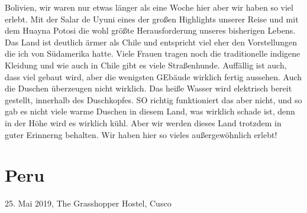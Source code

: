 \documentclass[11pt]{book}
\begin{document}
Bolivien, wir waren nur etwas länger als eine Woche hier aber wir haben so viel erlebt. Mit der Salar de Uyuni eines der großen Highlights unserer Reise 
und mit dem Huayna Potosi die wohl größte Herausforderung unseres bisherigen Lebens. Das Land ist deutlich ärmer als Chile und entspricht viel eher 
den Vorstellungen die ich von Südamerika hatte. Viele Frauen tragen noch die traditionelle indigene Kleidung und wie auch in Chile gibt es viele Straßenhunde. 
Auffällig ist auch, dass viel gebaut wird, aber die wenigsten GEbäude wirklich fertig aussehen. Auch die Duschen überzeugen nicht wirklich. Das heiße 
Wasser wird elektrisch bereit gestellt, innerhalb des Duschkopfes. SO richtig funktioniert das aber nicht, und so gab es nicht viele warme Duschen in diesem 
Land, was wirklich schade ist, denn in der Höhe wird es wirklich kühl. Aber wir werden dieses Land trotzdem in guter Erinnerng behalten. Wir haben 
hier so vieles außergewöhnlich erlebt!


\chapter{Peru}

25. Mai 2019, The Grasshopper Hostel, Cusco 
\end{document}
